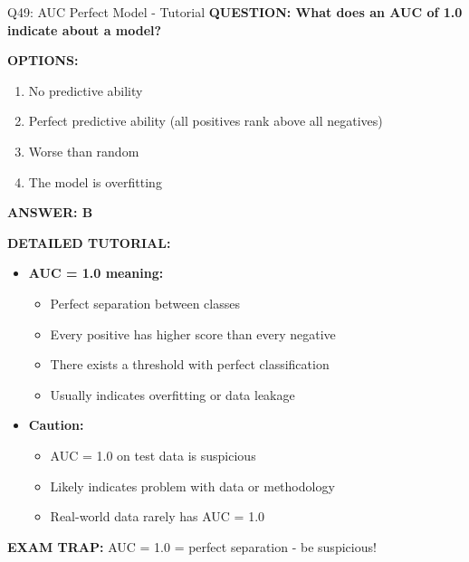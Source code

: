 \documentclass[8pt]{beamer}
\begin{document}
	\begin{frame}{Q49: AUC Perfect Model - Tutorial}
		\fontsize{6.5}{7.5}\selectfont
		\textbf{QUESTION: What does an AUC of 1.0 indicate about a model?}
		
		\vspace{0.1cm}
		\textbf{OPTIONS:}
		\begin{enumerate}
			\item No predictive ability
			\item Perfect predictive ability (all positives rank above all negatives)
			\item Worse than random
			\item The model is overfitting
		\end{enumerate}
		
		\vspace{0.1cm}
		\textcolor{myblue}{\textbf{ANSWER: B}}
		
		\vspace{0.1cm}
		\textbf{DETAILED TUTORIAL:}
		\begin{itemize}
			\item \textbf{AUC = 1.0 meaning:}
			\begin{itemize}
				\item Perfect separation between classes
				\item Every positive has higher score than every negative
				\item There exists a threshold with perfect classification
				\item Usually indicates overfitting or data leakage
			\end{itemize}
			\item \textbf{Caution:}
			\begin{itemize}
				\item AUC = 1.0 on test data is suspicious
				\item Likely indicates problem with data or methodology
				\item Real-world data rarely has AUC = 1.0
			\end{itemize}
		\end{itemize}
		
		\textcolor{myred}{\textbf{EXAM TRAP:}} AUC = 1.0 = \textcolor{myblue}{perfect separation} - be suspicious!
	\end{frame}
	
\end{document}
